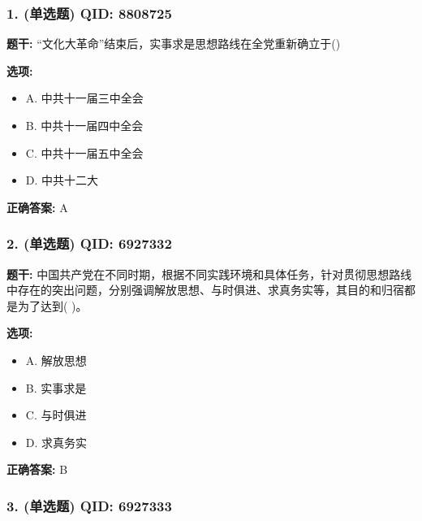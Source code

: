 \documentclass[12pt,UTF8]{ctexart}
\begin{document}
\subsubsection*{1. (单选题) \small QID: 8808725}

\textbf{题干:}
“文化大革命”结束后，实事求是思想路线在全党重新确立于()

\textbf{选项:}
\begin{itemize}[leftmargin=*]

  \item A. 中共十一届三中全会

  \item B. 中共十一届四中全会

  \item C. 中共十一届五中全会

  \item D. 中共十二大

\end{itemize}

\textbf{正确答案:}
A

\vspace{0.3em}\hrulefill\vspace{0.7em}

\subsubsection*{2. (单选题) \small QID: 6927332}

\textbf{题干:}
中国共产党在不同时期，根据不同实践环境和具体任务，针对贯彻思想路线中存在的突出问题，分别强调解放思想、与时俱进、求真务实等，其目的和归宿都是为了达到(   )。

\textbf{选项:}
\begin{itemize}[leftmargin=*]

  \item A. 解放思想

  \item B. 实事求是

  \item C. 与时俱进

  \item D. 求真务实

\end{itemize}

\textbf{正确答案:}
B

\vspace{0.3em}\hrulefill\vspace{0.7em}

\subsubsection*{3. (单选题) \small QID: 6927333}
\end{document}
